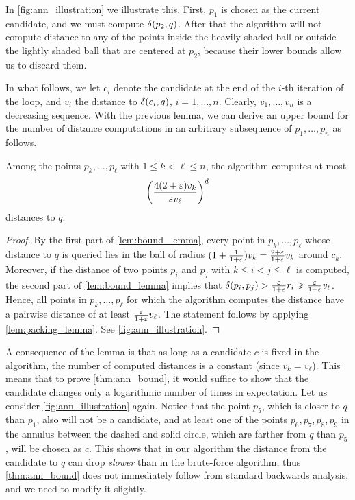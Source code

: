In \cref{fig:ann_illustration} we illustrate this. First, $p_1$ is
chosen as the current candidate, and we must compute $\delta(p_2, q)$.
After that the algorithm will not compute
distance to any of the points inside the heavily shaded ball or outside
the lightly shaded ball that are centered at $p_2$,
because their lower bounds allow us to discard them.


In what follows, we let $c_i$ denote the candidate
at the end of the $i$-th iteration of the loop, and $v_i$
the distance to $\delta(c_i, q)$, $i = 1, \dots, n$. Clearly, $v_1,\ldots,v_n$ is a decreasing sequence.
With the previous lemma, we can derive an upper bound for the number
of distance computations in an arbitrary subsequence of $p_1,\ldots,p_n$
as follows. 

\begin{lemma}
\label{lem:sequence_lemma}
Among the points $p_k,\ldots,p_\ell$ with $1\leq k< \ell\leq n$, the algorithm computes at most
\[\left(\frac{4(2+\varepsilon) v_k}{\varepsilon v_\ell}\right)^{d}\]
distances to $q$.
\end{lemma}
\begin{proof}
By the first part of \cref{lem:bound_lemma}, every point in $p_k,\ldots,p_\ell$
whose distance to $q$ is queried lies in the ball of radius $(1+\frac{1}{1+\varepsilon})v_k=\frac{2+\varepsilon}{1+\varepsilon} v_k$
around $c_k$. Moreover, if the distance of two points $p_i$ and $p_j$ with $k\leq i<j\leq\ell$
is computed, the second part of \cref{lem:bound_lemma} implies that $\delta(p_i,p_j)> \frac{\varepsilon}{1+\varepsilon}r_i\geqslant \frac{\varepsilon}{1+\varepsilon}v_\ell$.
Hence, all points in $p_k,\ldots,p_\ell$ for which the algorithm computes the distance
have a pairwise distance of at least $\frac{\varepsilon}{1+\varepsilon}v_\ell$. The statement follows by applying \cref{lem:packing_lemma}.
See \cref{fig:ann_illustration}.
\end{proof}

A consequence of the lemma is that as long as a candidate $c$ is fixed in the algorithm,
the number of computed distances is a constant (since $v_k=v_\ell$). 
This means that to prove \cref{thm:ann_bound}, it would suffice to show
that the candidate changes only a logarithmic number of times in expectation.
Let us consider \cref{fig:ann_illustration} again. Notice that the point $p_5$, which
is closer to $q$ than $p_1$, also will not be a candidate, and at least one of the points 
$p_6,p_7,p_8,p_9$ in the annulus between the dashed and solid circle, which are farther from 
$q$ than $p_5$, will be chosen as $c$. This shows that in our algorithm the distance from the 
candidate to $q$ can drop \textit{slower} than in the brute-force algorithm, 
thus \cref{thm:ann_bound} does not immediately follow from standard backwards analysis,
and we need to modify it slightly.


